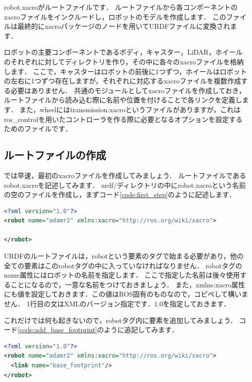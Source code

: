\documentclass[{../../master}]{subfiles}
\begin{document}
\textsf{robot.xacro}がルートファイルです．
ルートファイルから各コンポーネントのxacroファイルをインクルードし，ロボットのモデルを作成します．
このファイルは最終的に\textsf{xacro}パッケージのノードを用いてURDFファイルに変換されます．

ロボットの主要コンポーネントであるボディ，キャスター，LiDAR，ホイールのそれぞれに対してディレクトリを作り，その中に各々の\textsf{xacro}ファイルを格納します．
ここで，キャスターはロボットの前後に1つずつ，ホイールはロボットの左右に1つずつ存在しますが，それぞれに対応する\textsf{xacro}ファイルを複数作成する必要はありません．
共通のモジュールとして\textsf{xacro}ファイルを作成しておき，ルートファイルから読み込む際に名前や位置を付けることで各リンクを定義します．
また，\textsf{wheel}には\textsf{transmission.xacro}というファイルがありますが，これは\textsf{ros\_control}を用いたコントローラを作る際に必要となるオプションを設定するためのファイルです．

\subsection{ルートファイルの作成}

では早速，最初の\textsf{xacro}ファイルを作成してみましょう．
ルートファイルである\textsf{robot.xacro}を記述してみます．
\textsf{urdf/}ディレクトリの中に\textsf{robot.xacro}という名前の空のファイルを作成し，まずコード\ref{code:first_step}のように記述します．

\begin{lstlisting}[language=XML, label=code:first_step, caption=\textsf{robot.xacro}]
<?xml version="1.0"?>
<robot name="adamr2" xmlns:xacro="http://ros.org/wiki/xacro">
 
</robot>
\end{lstlisting}

URDFのルートファイルは，\textsf{robot}という要素のタグで始まる必要があり，他の全ての要素はこの\textsf{robot}タグの中に入っていなければなりません．\cite{urdf_xml_robot}
\textsf{robot}タグの\textsf{name}属性にはロボットの名前を指定します．
ここで指定した名前は後々使用することになるので，一意な名前をつけておきましょう．
また，\textsf{xmlns:xacro}属性にも値を設定しておきます．この値はROS固有のものなので，コピペして構いません．
1行目の文はXMLのバージョン指定です．1.0を指定しておきます．

これだけでは何も起きないので，\textsf{robot}タグ内に要素を追加してみましょう．
コード\ref{code:add_base_footprint}のように追記してみます．

\begin{lstlisting}[language=XML, label=code:add_base_footprint, caption=\textsf{robot.xacro}]
<?xml version="1.0"?>
<robot name="adamr2" xmlns:xacro="http://ros.org/wiki/xacro">
  <link name="base_footprint"/>
</robot>
\end{lstlisting}
\end{document}
